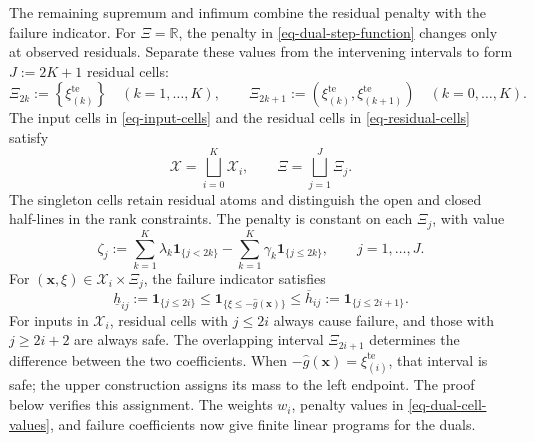 \documentclass[review,11pt,3p,authoryear,nopreprintline]{elsarticle}
\begin{document}
The remaining supremum and infimum combine the residual penalty with the failure indicator. For $\Xi=\mathbb R$, the penalty in \eqref{eq-dual-step-function} changes only at observed residuals. Separate these values from the intervening intervals to form $J:=2K+1$ residual cells:
\begin{equation}
  \Xi_{2k}:=\left\{\xi_{(k)}^{\mathrm{te}}\right\}
    \quad\left(k=1,\ldots,K\right),
  \qquad
  \Xi_{2k+1}:=\left(\xi_{(k)}^{\mathrm{te}},\xi_{(k+1)}^{\mathrm{te}}\right)
    \quad\left(k=0,\ldots,K\right).
  \label{eq-residual-cells}
\end{equation}
The input cells in \eqref{eq-input-cells} and the residual cells in \eqref{eq-residual-cells} satisfy
\begin{equation*}
  \mathcal X=\bigsqcup_{i=0}^K\mathcal X_i,
  \qquad
  \Xi=\bigsqcup_{j=1}^J\Xi_j.
\end{equation*}
The singleton cells retain residual atoms and distinguish the open and closed half-lines in the rank constraints. The penalty is constant on each $\Xi_j$, with value
\begin{equation}
  \zeta_j:=\sum_{k=1}^K\lambda_k\mathbf1_{\{j<2k\}}
    -\sum_{k=1}^K\gamma_k\mathbf1_{\{j\le2k\}},
    \qquad j=1,\ldots,J.
  \label{eq-dual-cell-values}
\end{equation}
For $(\bm x,\xi)\in\mathcal X_i\times\Xi_j$, the failure indicator satisfies
\begin{equation}
  \underline h_{ij}:=\mathbf1_{\{j\le2i\}}
  \le\mathbf1_{\{\xi\le-\hat g(\bm x)\}}
  \le\overline h_{ij}:=\mathbf1_{\{j\le2i+1\}}.
  \label{eq-cell-costs}
\end{equation}
For inputs in $\mathcal X_i$, residual cells with $j\le2i$ always cause failure, and those with $j\ge2i+2$ are always safe. The overlapping interval $\Xi_{2i+1}$ determines the difference between the two coefficients. When $-\hat g(\bm x)=\xi_{(i)}^{\mathrm{te}}$, that interval is safe; the upper construction assigns its mass to the left endpoint. The proof below verifies this assignment. The weights $w_i$, penalty values in \eqref{eq-dual-cell-values}, and failure coefficients now give finite linear programs for the duals.
\end{document}
